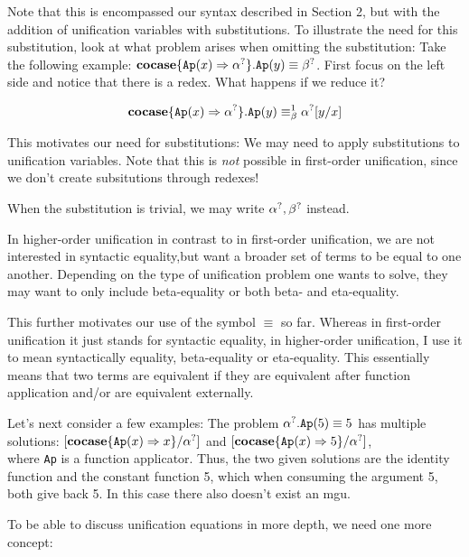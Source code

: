 \documentclass[twoside,12pt,a4paper]{article}
\begin{document}
Note that this is encompassed our syntax described in Section 2, %
but with the addition of unification variables with substitutions. 
To illustrate the need for this substitution, look at what problem arises when omitting the substitution:
Take the following example: $\textbf{cocase}\{\texttt{Ap}(x)\Rightarrow\alpha^?\}.\texttt{Ap}(y)\equiv\beta^?$. 
First focus on the left side and notice that there is a redex. What happens if we reduce it?

\begin{align*}
    \textbf{cocase}\{\texttt{Ap}(x)\Rightarrow\alpha^?\}.\texttt{Ap}(y)\equiv_{\beta}^1\alpha^?[y/x]    
\end{align*}

This motivates our need for substitutions: We may need to apply substitutions to unification variables.
Note that this is \textit{not} possible in first-order unification, since we don't create subsitutions through redexes! 

When the substitution is trivial, we may  write $\alpha^?, \beta^?$ instead.

In higher-order unification in contrast to in first-order unification, we are not interested in syntactic equality,but want a broader set of terms to be equal to one another.
Depending on the type of unification problem one wants to solve, they may want to only include beta-equality or both 
beta- and eta-equality.

This further motivates our use of the symbol $\equiv$ so far. Whereas in first-order unification it just stands for syntactic equality, 
in higher-order unification, I use it to mean syntactically equality, beta-equality or eta-equality.
This essentially means that two terms are equivalent if they are equivalent after function application and/or are equivalent externally.

Let's next consider a few examples:
The problem $\alpha^?.\texttt{Ap}(5) \equiv 5$ has multiple solutions:
$[\textbf{cocase}\{\texttt{Ap}(x)\Rightarrow x\} / \alpha^?]$ and $[\textbf{cocase}\{\texttt{Ap}(x)\Rightarrow 5\} / \alpha^?]$,\\
where \texttt{Ap} is a function applicator. 
Thus, the two given solutions are the identity function and the constant function 5, which when consuming the argument 5, both give back 5.
In this case there also doesn't exist an mgu.


To be able to discuss unification equations in more depth, we need one more concept:
\end{document}
